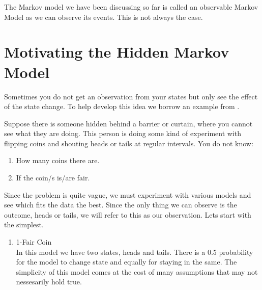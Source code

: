 The Markov model we have been discussing so far is called an observable Markov Model as we can observe its events. This is not always the case.


\section{Motivating the Hidden Markov Model}

Sometimes you do not get an observation from your states but only see the effect of the state change. To help develop this idea we borrow an example from \cite{1165342}.

\begin{example}
	\label{motivhmmcoin}
	Suppose there is someone hidden behind a barrier or curtain, where you cannot see what they are doing. This person is doing some kind of experiment with flipping coins and shouting heads or tails at regular intervals. You do not know:
	\begin{enumerate}[i]
		\item How many coins there are.
		\item If the coin/s is/are fair.
	\end{enumerate}
	Since the problem is quite vague, we must experiment with various models and see which fits the data the best. Since the only thing we can observe is the outcome, heads or tails, we will refer to this as our observation. Lets start with the simplest. 
	\begin{enumerate}
		\item 1-Fair Coin \\ In this model we have two states, heads and tails. There is a 0.5 probability for the model to change state and equally for staying in the same. The simplicity of this model comes at the cost of many assumptions that may not nessesarily hold true.
		\begin{center}
			

\end{center}
\end{enumerate}
\end{example}
